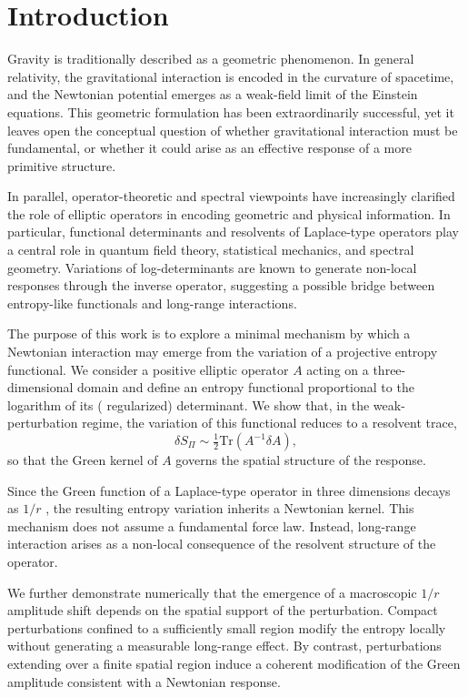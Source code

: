 \section{Introduction}
  \label{sec:introduction}

  Gravity is traditionally described as a geometric phenomenon.
  In general relativity, the gravitational interaction is encoded in the curvature of spacetime, and the Newtonian
  potential emerges as a weak-field limit of the Einstein equations.
  This geometric formulation has been extraordinarily successful, yet it leaves open the conceptual question of whether
  gravitational interaction must be fundamental, or whether it could arise as an effective response of a more primitive
  structure.

  In parallel, operator-theoretic and spectral viewpoints have increasingly clarified the role of elliptic operators in
  encoding geometric and physical information.
  In particular, functional determinants and resolvents of Laplace-type operators play a central role in quantum field
  theory, statistical mechanics, and spectral geometry.
  Variations of log-determinants are known to generate non-local responses through the inverse operator, suggesting a
  possible bridge between entropy-like functionals and long-range interactions.

  The purpose of this work is to explore a minimal mechanism by which a Newtonian interaction may emerge from the
  variation of a projective entropy functional.
  We consider a positive elliptic operator $A$
  acting on a three-dimensional domain and define an entropy functional proportional to the logarithm of its (
  regularized) determinant.
  We show that, in the weak-perturbation regime, the variation of this functional reduces to a resolvent trace,
  \begin{equation}
    \delta S_\Pi \sim \tfrac12 \mathrm{Tr}(A^{-1} \delta A),
  \end{equation}
  so that the Green kernel of $A$ governs the spatial structure of the response.

  Since the Green function of a Laplace-type operator in three dimensions decays as $1/r$
  , the resulting entropy variation inherits a Newtonian kernel.
  This mechanism does not assume a fundamental force law.
  Instead, long-range interaction arises as a non-local consequence of the resolvent structure of the operator.

  We further demonstrate numerically that the emergence of a macroscopic $1/r$
  amplitude shift depends on the spatial support of the perturbation.
  Compact perturbations confined to a sufficiently small region modify the entropy locally without generating a
  measurable long-range effect.
  By contrast, perturbations extending over a finite spatial region induce a coherent modification of the Green
  amplitude consistent with a Newtonian response.

